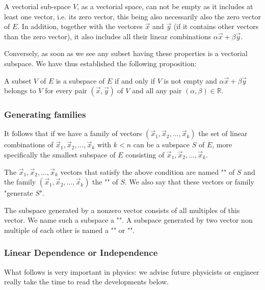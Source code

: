 	A vectorial sub-space $V$, as a vectorial space, can not be empty as it includes at least one vector, i.e. its zero vector, this being also necessarily also the zero vector of $E$. In addition, together with the vectores $\vec{x}$ and $\vec{y}$ (if it contains other vectors than the zero vector), it also includes all their linear combinations $\alpha\vec{x}+\beta\vec{y}$.
	
	Conversely, as soon as we see any subset having these properties is a vectorial subspace. We have thus established the following proposition:
	
	A subset $V$ of $E$ is a subspace of $E$ if and only if $V$ is not empty and $\alpha\vec{x}+\beta\vec{y}$ belongs to $V$ for every pair $(\vec{x},\vec{y})$ of $V$ and all any pair $(\alpha,\beta) \in \mathbb{R}$.
	
	\subsubsection{Generating families}
	It follows that if we have a family of vectors $(\vec{x}_1,\vec{x}_2,...,\vec{x}_k)$ the set of linear combinations of $\vec{x}_1,\vec{x}_2,...,\vec{x}_k$ with $k<n$ can be a subspace $S$ of $E$, more specifically the smallest subspace of $E$ consisting of $\vec{x}_1,\vec{x}_2,...,\vec{x}_k$.
	
	The $\vec{x}_1,\vec{x}_2,...,\vec{x}_k$ vectors that satisfy the above condition are named "" of $S$ and the family $(\vec{x}_1,\vec{x}_2,...,\vec{x}_k)$ the "" of $S$. We also say that these vectors or family "generate $S$".
	
	\begin{tcolorbox}[title=Remark,colframe=black,arc=10pt]
The subspace generated by a nonzero vector consists of all multiples of this vector. We name such a subspace a "". A subspace generated by two vector non multiple of each other is named a "" or "".
	\end{tcolorbox}
	
	\subsubsection{Linear Dependence or Independence}
	What follows is very important in physics: we advise future physicists or engineer really take the time to read the developments below.
	
